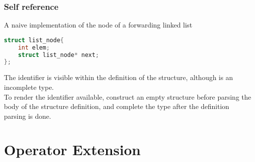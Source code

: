 \documentclass{beamer}
\begin{document}
\begin{frame}[fragile]
    \frametitle{Self reference}

    \begin{example}
        A naive implementation of the node of a forwarding linked list
        \begin{lstlisting}[language=C]
struct list_node{
    int elem;
    struct list_node* next;
};
        \end{lstlisting}
    \end{example}

    The identifier  is visible within the definition of the structure, although  is an incomplete type. 
    \\
    To render the identifier  available, construct an empty structure before parsing the body of the structure definition, and complete the type after the definition parsing is done. 
\end{frame}






\section{Operator Extension}
\end{document}
